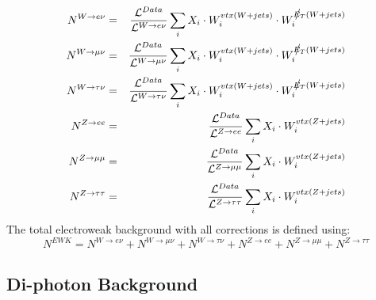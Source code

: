 \begin{eqnarray}
N^{W\to e\nu} &=& \frac{{\cal L}^{Data}}{{\cal L}^{W\to e\nu}} \sum_{i} X_{i} \cdot W^{vtx(W+jets)}_{i} \cdot W^{\sla{E}_{T}(W+jets)}_{i}\\
N^{W\to \mu\nu} &=& \frac{{\cal L}^{Data}}{{\cal L}^{W\to \mu\nu}} \sum_{i} X_{i} \cdot W^{vtx(W+jets)}_{i} \cdot W^{\sla{E}_{T}(W+jets)}_{i}\\
N^{W\to \tau\nu} &=& \frac{{\cal L}^{Data}}{{\cal L}^{W\to \tau\nu}} \sum_{i} X_{i} \cdot W^{vtx(W+jets)}_{i} \cdot W^{\sla{E}_{T}(W+jets)}_{i}\\
N^{Z\to ee} &=& \frac{{\cal L}^{Data}}{{\cal L}^{Z\to ee}} \sum_{i} X_{i} \cdot W^{vtx(Z+jets)}_{i}\\
N^{Z\to \mu\mu} &=& \frac{{\cal L}^{Data}}{{\cal L}^{Z\to \mu\mu}} \sum_{i} X_{i} \cdot W^{vtx(Z+jets)}_{i}\\
N^{Z\to \tau\tau} &=& \frac{{\cal L}^{Data}}{{\cal L}^{Z\to \tau\tau}} \sum_{i} X_{i} \cdot W^{vtx(Z+jets)}_{i}
\label{eqa:WenTotal}
\end{eqnarray}
The total electroweak background with all corrections is defined using:
\begin{equation}
N^{EWK} = N^{W\to e\nu} + N^{W\to \mu\nu} + N^{W\to \tau\nu} + N^{Z\to ee} + N^{Z\to \mu\mu} + N^{Z\to \tau\tau}
\label{eqa:EWKtotalWeighted}
\end{equation}



\subsection{Di-photon Background}\label{sec:diphoton}

